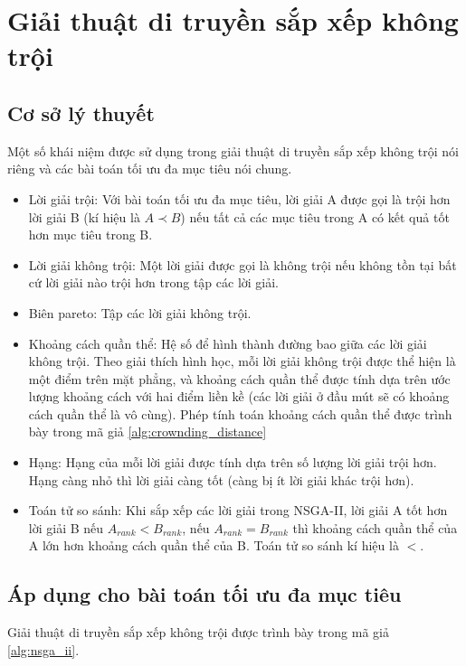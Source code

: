 \documentclass{hust}
\begin{document}
\section{Giải thuật di truyền sắp xếp không trội}
\subsection{Cơ sở lý thuyết}
Một số khái niệm được sử dụng trong giải thuật di truyền sắp xếp không trội nói riêng và các bài toán tối ưu đa mục tiêu nói chung.
\begin{itemize}
	\item Lời giải trội: Với bài toán tối ưu đa mục tiêu, lời giải A được gọi là trội hơn lời giải B (kí hiệu là $A \prec B$) nếu tất cả các mục tiêu trong A có kết quả tốt hơn mục tiêu trong B.
	\item Lời giải không trội: Một lời giải được gọi là không trội nếu không tồn tại bất cứ lời giải nào trội hơn trong tập các lời giải.
	\item Biên pareto: Tập các lời giải không trội.
	\item Khoảng cách quần thể: Hệ số để hình thành đường bao giữa các lời giải không trội. Theo giải thích hình học, mỗi lời giải không trội được thể hiện là một điểm trên mặt phẳng, và khoảng cách quần thể được tính dựa trên ước lượng khoảng cách với hai điểm liền kề (các lời giải ở đầu mút sẽ có khoảng cách quần thể là vô cùng). Phép tính toán khoảng cách quần thể được trình bày trong mã giả \ref{alg:crownding_distance}
	\item Hạng: Hạng của mỗi lời giải được tính dựa trên số lượng lời giải trội hơn. Hạng càng nhỏ thì lời giải càng tốt (càng bị ít lời giải khác trội hơn).
	\item Toán tử so sánh: Khi sắp xếp các lời giải trong \gls{NSGA-II}, lời giải A tốt hơn lời giải B nếu $A_{rank} < B_{rank}$, nếu $A_{rank} = B_{rank}$ thì khoảng cách quần thể của A lớn hơn khoảng cách quần thể của B. Toán tử so sánh kí hiệu là $<$.
\end{itemize}
\subsection{Áp dụng cho bài toán tối ưu đa mục tiêu}
Giải thuật di truyền sắp xếp không trội được trình bày trong mã giả \ref{alg:nsga_ii}.
\end{document}
